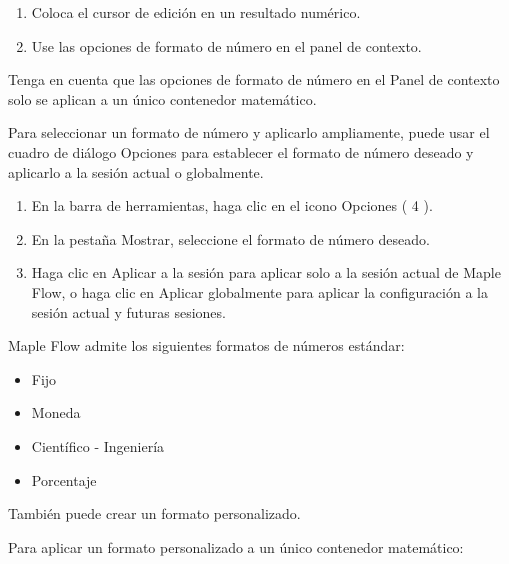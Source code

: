 \begin{enumerate}
  \item Coloca el cursor de edición en un resultado numérico.

\item Use las opciones de formato de número en el panel de contexto.
\end{enumerate}


Tenga en cuenta que las opciones de formato de número en el Panel de contexto solo se aplican a un único contenedor matemático.

Para seleccionar un formato de número y aplicarlo ampliamente, puede usar el cuadro de diálogo Opciones para establecer el formato de número deseado y aplicarlo a la sesión actual o globalmente.

\begin{enumerate}
  \item En la barra de herramientas, haga clic en el icono Opciones ( 4 ).

\item En la pestaña Mostrar, seleccione el formato de número deseado.

\item Haga clic en Aplicar a la sesión para aplicar solo a la sesión actual de Maple Flow, o haga clic en Aplicar globalmente para aplicar la configuración a la sesión actual y futuras sesiones.
\end{enumerate}


Maple Flow admite los siguientes formatos de números estándar:
\begin{itemize}
  \item Fijo

\item Moneda

\item Científico - Ingeniería

\item Porcentaje
\end{itemize}

También puede crear un formato personalizado.

Para aplicar un formato personalizado a un único contenedor matemático:

